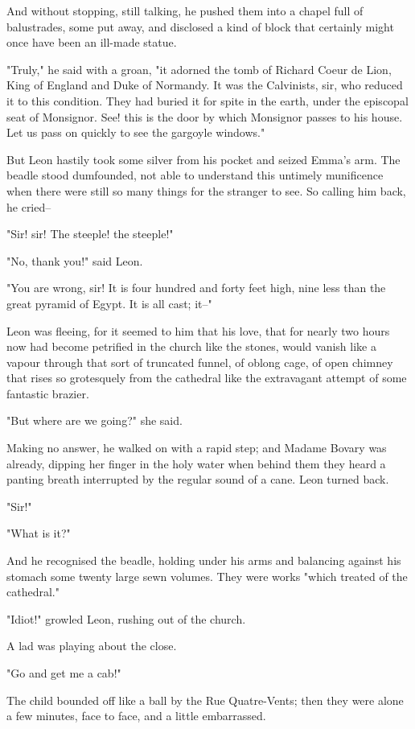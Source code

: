 \documentclass[11pt,twocolumn]{ltugboat}
\begin{document}
And without stopping, still talking, he pushed them into a chapel
full of balustrades, some put away, and disclosed a kind of block that
certainly might once have been an ill-made statue.

"Truly," he said with a groan, "it adorned the tomb of Richard Coeur de
Lion, King of England and Duke of Normandy. It was the Calvinists, sir,
who reduced it to this condition. They had buried it for spite in the
earth, under the episcopal seat of Monsignor. See! this is the door by
which Monsignor passes to his house. Let us pass on quickly to see the
gargoyle windows."

But Leon hastily took some silver from his pocket and seized Emma's
arm. The beadle stood dumfounded, not able to understand this untimely
munificence when there were still so many things for the stranger to
see. So calling him back, he cried--

"Sir! sir! The steeple! the steeple!"

"No, thank you!" said Leon.

"You are wrong, sir! It is four hundred and forty feet high, nine less
than the great pyramid of Egypt. It is all cast; it--"

Leon was fleeing, for it seemed to him that his love, that for nearly
two hours now had become petrified in the church like the stones, would
vanish like a vapour through that sort of truncated funnel, of oblong
cage, of open chimney that rises so grotesquely from the cathedral like
the extravagant attempt of some fantastic brazier.

"But where are we going?" she said.

Making no answer, he walked on with a rapid step; and Madame Bovary
was already, dipping her finger in the holy water when behind them they
heard a panting breath interrupted by the regular sound of a cane. Leon
turned back.

"Sir!"

"What is it?"

And he recognised the beadle, holding under his arms and balancing
against his stomach some twenty large sewn volumes. They were works
"which treated of the cathedral."

"Idiot!" growled Leon, rushing out of the church.

A lad was playing about the close.

"Go and get me a cab!"

The child bounded off like a ball by the Rue Quatre-Vents; then they
were alone a few minutes, face to face, and a little embarrassed.
\end{document}
